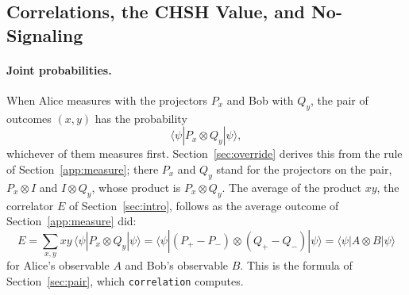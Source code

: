 \documentclass[11pt]{article}
\newcommand{\hs}{\lstinline[style=hask,basicstyle=\ttfamily,frame=none]}
\begin{document}
\subsection{Correlations, the CHSH Value, and No-Signaling}\label{app:chsh}

\paragraph{Joint probabilities.} When Alice measures with the projectors $P_x$ and Bob with $Q_y$, the pair of outcomes $(x, y)$ has the probability
\[
  \langle\psi|P_x \otimes Q_y|\psi\rangle,
\]
whichever of them measures first. Section~\ref{sec:override} derives this from the rule of Section~\ref{app:measure}; there $P_x$ and $Q_y$ stand for the projectors on the pair, $P_x \otimes I$ and $I \otimes Q_y$, whose product is $P_x \otimes Q_y$. The average of the product $xy$, the correlator $E$ of Section~\ref{sec:intro}, follows as the average outcome of Section~\ref{app:measure} did:
\[
  E = \sum_{x, y} xy\, \langle\psi|P_x \otimes Q_y|\psi\rangle = \langle\psi|(P_+ - P_-) \otimes (Q_+ - Q_-)|\psi\rangle = \langle\psi|A \otimes B|\psi\rangle
\]
for Alice's observable $A$ and Bob's observable $B$. This is the formula of Section~\ref{sec:pair}, which \hs|correlation| computes.
\end{document}
